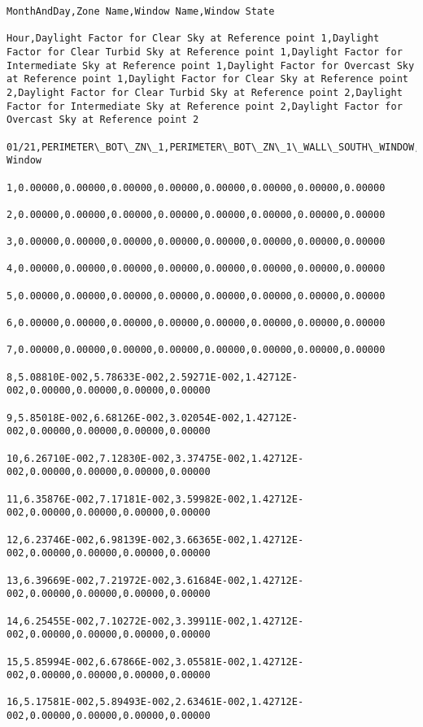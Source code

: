 \begin{lstlisting}
MonthAndDay,Zone Name,Window Name,Window State

Hour,Daylight Factor for Clear Sky at Reference point 1,Daylight Factor for Clear Turbid Sky at Reference point 1,Daylight Factor for Intermediate Sky at Reference point 1,Daylight Factor for Overcast Sky at Reference point 1,Daylight Factor for Clear Sky at Reference point 2,Daylight Factor for Clear Turbid Sky at Reference point 2,Daylight Factor for Intermediate Sky at Reference point 2,Daylight Factor for Overcast Sky at Reference point 2

01/21,PERIMETER\_BOT\_ZN\_1,PERIMETER\_BOT\_ZN\_1\_WALL\_SOUTH\_WINDOW,Base Window

1,0.00000,0.00000,0.00000,0.00000,0.00000,0.00000,0.00000,0.00000

2,0.00000,0.00000,0.00000,0.00000,0.00000,0.00000,0.00000,0.00000

3,0.00000,0.00000,0.00000,0.00000,0.00000,0.00000,0.00000,0.00000

4,0.00000,0.00000,0.00000,0.00000,0.00000,0.00000,0.00000,0.00000

5,0.00000,0.00000,0.00000,0.00000,0.00000,0.00000,0.00000,0.00000

6,0.00000,0.00000,0.00000,0.00000,0.00000,0.00000,0.00000,0.00000

7,0.00000,0.00000,0.00000,0.00000,0.00000,0.00000,0.00000,0.00000

8,5.08810E-002,5.78633E-002,2.59271E-002,1.42712E-002,0.00000,0.00000,0.00000,0.00000

9,5.85018E-002,6.68126E-002,3.02054E-002,1.42712E-002,0.00000,0.00000,0.00000,0.00000

10,6.26710E-002,7.12830E-002,3.37475E-002,1.42712E-002,0.00000,0.00000,0.00000,0.00000

11,6.35876E-002,7.17181E-002,3.59982E-002,1.42712E-002,0.00000,0.00000,0.00000,0.00000

12,6.23746E-002,6.98139E-002,3.66365E-002,1.42712E-002,0.00000,0.00000,0.00000,0.00000

13,6.39669E-002,7.21972E-002,3.61684E-002,1.42712E-002,0.00000,0.00000,0.00000,0.00000

14,6.25455E-002,7.10272E-002,3.39911E-002,1.42712E-002,0.00000,0.00000,0.00000,0.00000

15,5.85994E-002,6.67866E-002,3.05581E-002,1.42712E-002,0.00000,0.00000,0.00000,0.00000

16,5.17581E-002,5.89493E-002,2.63461E-002,1.42712E-002,0.00000,0.00000,0.00000,0.00000


\end{lstlisting}
